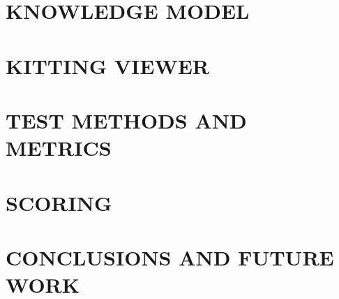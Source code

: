 \documentclass[letterpaper, 10 pt, conference]{ieeeconf}  %
\begin{document}
\section{KNOWLEDGE MODEL}

\section{KITTING VIEWER}
\label{sect:KittingViewer}


\section{TEST METHODS AND METRICS}
\label{sect:Metrics}


\section{SCORING} 
\label{sect:Results}





\section{CONCLUSIONS AND FUTURE WORK}
\label{sect:Conclusions}





\end{document}
